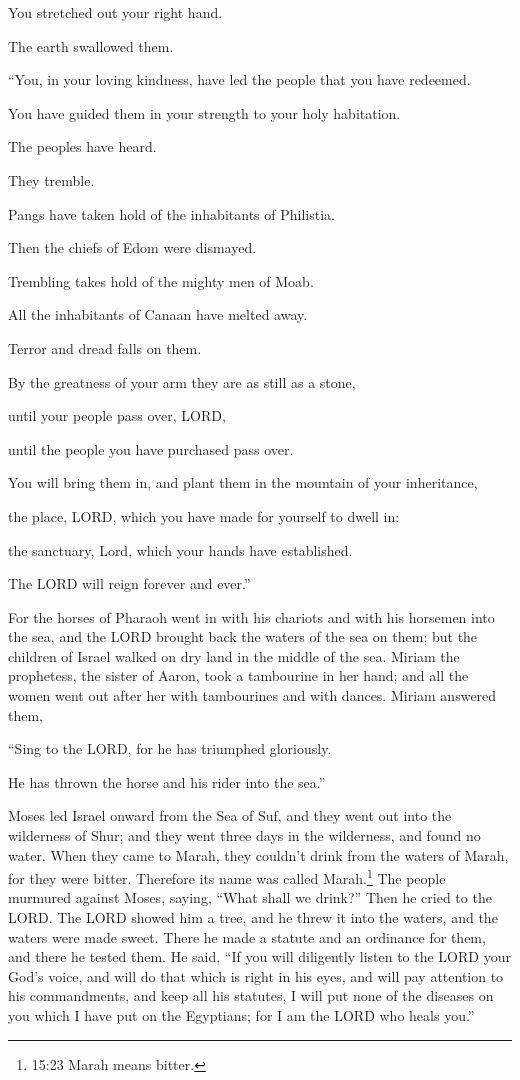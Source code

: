 \myverse{}You stretched out your right hand.

The earth swallowed them.


\myverse{}“You, in your loving kindness, have led the people that you
have redeemed.

You have guided them in your strength to your holy habitation.


\myverse{}The peoples have heard.

They tremble.

Pangs have taken hold of the inhabitants of Philistia.


\myverse{}Then the chiefs of Edom were dismayed.

Trembling takes hold of the mighty men of Moab.

All the inhabitants of Canaan have melted away.


\myverse{}Terror and dread falls on them.

By the greatness of your arm they are as still as a stone,

until your people pass over, LORD,

until the people you have purchased pass over.


\myverse{}You will bring them in, and plant them in the mountain
of your inheritance,

the place, LORD, which you have made for yourself to dwell in:

the sanctuary, Lord, which your hands have established.


\myverse{}The LORD will reign forever and ever.”


\myverse{}For the horses of Pharaoh went in with his chariots and with
his horsemen into the sea, and the LORD brought back the waters of the sea on them; but the children of
Israel walked on dry land in the middle of the sea.
\myverse{}Miriam the prophetess, the sister of Aaron, took a tambourine in her hand;
and all the women went out after her with tambourines and with dances.
\myverse{}Miriam answered them,

“Sing to the LORD, for he has triumphed gloriously.

He has thrown the horse and his rider into the sea.”


\myverse{}Moses led Israel onward from the Sea of Suf, and they went out
into the wilderness of Shur; and they went three days in the wilderness, and found no water.
\myverse{}When they came to Marah, they couldn’t drink from the waters of Marah, for
they were bitter. Therefore its name was called Marah.\footnote{15:23 Marah means bitter.}
\myverse{}The people murmured against Moses, saying, “What shall we drink?”
\myverse{}Then he cried to the LORD. The LORD showed him a tree, and he threw it into
the waters, and the waters were made sweet. There he made a statute and an ordinance for them, and there
he tested them.
\myverse{}He said, “If you will diligently listen to the LORD your God’s voice, and
will do that which is right in his eyes, and will pay attention to his commandments, and keep all his
statutes, I will put none of the diseases on you which I have put on the Egyptians; for I am the LORD
who heals you.”


